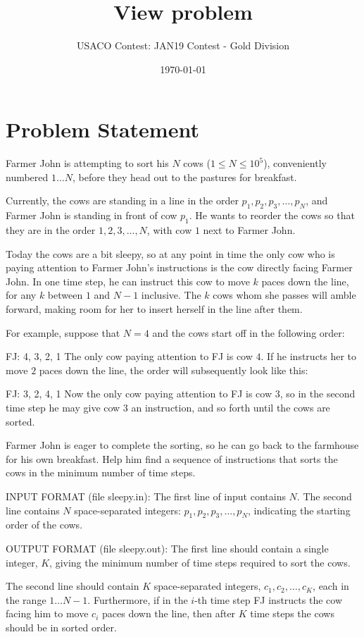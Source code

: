\documentclass[12pt]{article}
\title{View problem}
\author{USACO Contest: JAN19 Contest - Gold Division}
\date{\today}
\begin{document}
\maketitle

\section*{Problem Statement}

Farmer John is attempting to sort his $N$ cows ($1 \leq N \leq 10^5$),
conveniently numbered $1 \dots N$, before they head out to the pastures for
breakfast.

Currently, the cows are standing in a line in the order
$p_1, p_2, p_3, \dots, p_N$, and Farmer John is standing in front of cow $p_1$.
He wants to reorder the cows so that they are in the order $1, 2, 3, \dots, N$,
with cow $1$ next to Farmer John.

Today the cows are a bit sleepy, so at any point in time the only cow who is
paying attention to Farmer John's instructions is the cow directly facing Farmer
John. In one time step, he can instruct this cow to move $k$ paces down the
line, for any $k$ between $1$ and $N-1$ inclusive. The $k$ cows whom she passes
will amble forward, making room for her to insert herself in the line after
them.

For example, suppose that $N=4$ and the cows start off in the following order:

 FJ: 4, 3, 2, 1 
The only cow paying attention to FJ is cow $4$. If he instructs her to move $2$
paces down the line, the order will subsequently look like this:

 FJ: 3, 2, 4, 1 
Now the only cow paying attention to FJ is cow $3$, so in the second time step
he may give cow $3$ an instruction, and so forth until the cows are sorted.

Farmer John is eager to complete the sorting, so he can go back to the farmhouse
for his own breakfast. Help him find a sequence of instructions that sorts the
cows in the minimum number of time steps.

INPUT FORMAT (file sleepy.in):
The first line of input contains $N$.  The second line contains $N$ space-separated integers:
$p_1, p_2, p_3, \dots, p_N$, indicating the starting order of the cows.

OUTPUT FORMAT (file sleepy.out):
The first line should contain a single integer, $K$, giving the minimum number of time
steps required to sort the cows.

The second line should contain $K$ space-separated integers,
$c_1, c_2, \dots, c_K$, each in the range $1 \ldots N-1$.  
Furthermore, if in the $i$-th time step FJ
instructs the cow facing him to move $c_i$ paces down the line, then after $K$
time steps the cows should be in sorted order.
\end{document}
